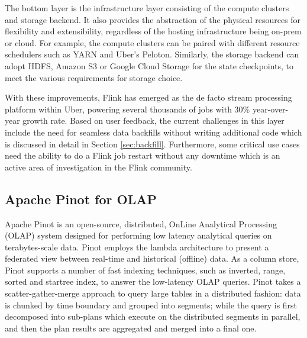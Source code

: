 \documentclass[sigconf]{acmart}
\begin{document}
The bottom layer is the infrastructure layer consisting of the compute clusters and storage backend. It also provides the abstraction of the physical resources for flexibility and extensibility, regardless of the hosting infrastructure being on-prem or cloud. For example, the compute clusters can be paired with different resource schedulers such as YARN and Uber’s Peloton\cite{peloton}. Similarly, the storage backend can adopt HDFS, Amazon S3\cite{s3} or Google Cloud Storage\cite{gcs} for the state checkpoints, to meet the various requirements for storage choice. 

With these improvements, Flink has emerged as the de facto stream processing platform within Uber, powering several thousands of jobs with 30\% year-over-year growth rate. Based on user feedback, the current challenges in this layer include the need for seamless data backfills without writing additional code which is discussed in detail in Section \ref{sec:backfill}. Furthermore, some critical use cases need the ability to do a Flink job restart without any downtime which is an active area of investigation in the Flink community.

\subsection{Apache Pinot for OLAP} \label{sec:pinot}

Apache Pinot\cite{im2018pinot} is an open-source, distributed, OnLine Analytical Processing (OLAP) system designed for performing low latency analytical queries on terabytes-scale data. Pinot employs the lambda architecture to present a federated view between real-time and historical (offline) data. As a column store, Pinot supports a number of fast indexing techniques, such as inverted, range, sorted and startree index\cite{im2018pinot}, to answer the low-latency OLAP queries. Pinot takes a scatter-gather-merge approach to query large tables in a distributed fashion: data is chunked by time boundary and grouped into segments; while the query is first decomposed into sub-plans which execute on the distributed segments in parallel, and then the plan results are aggregated and merged into a final one. 
\end{document}
